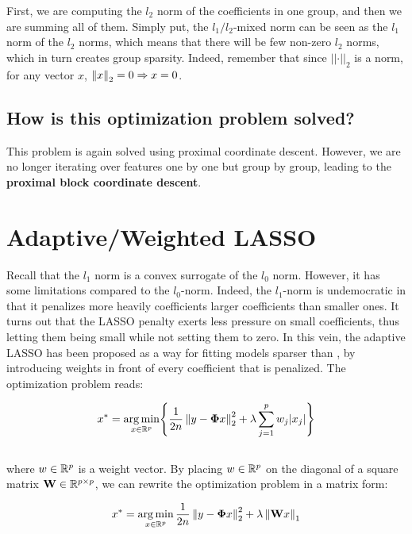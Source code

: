 \documentclass[a4paper,10pt]{article}
\theoremstyle{definition}
\begin{document}
First, we are computing the $l_2$ norm of the coefficients in one group, and then we are summing all of them. Simply put, the $l_1/l_2$-mixed norm can be seen
as the $l_1$ norm of the $l_2$ norms, which means that there will be few non-zero $l_2$ norms, which in turn creates group sparsity. Indeed, remember that since $\lvert \lvert \cdot \rvert \rvert_2$ is a norm, for any vector $x$,
$\left \lVert  x \right \rVert_2 = 0 \Rightarrow x = 0$.

\subsection*{How is this optimization problem solved?}

This problem is again solved using proximal coordinate descent. However, we are no longer iterating over features one by one but group by group, leading to the \textbf{proximal block coordinate descent}.

\section{Adaptive/Weighted LASSO}
\label{section_3}

Recall that the $l_1$ norm is a convex surrogate of the $l_0$ norm. However, it has some limitations compared to
the $l_0$-norm. Indeed, the $l_1$-norm is undemocratic in that it penalizes more heavily coefficients larger coefficients than smaller ones. It turns out that the LASSO penalty exerts less pressure on small coefficients,
thus letting them being small while not setting them to zero. In this vein, the adaptive LASSO has been proposed as a way for fitting models sparser than , by introducing weights in front of every coefficient that is
penalized. The optimization problem reads:

\begin{equation*}
    x^* = \operatorname*{arg\,min}_{x \in \mathbb{R}^p} \Biggl\{ \frac{1}{2n} \left \lVert  y - \mathbf{\Phi}x \right \rVert_2^2 + \lambda \sum_{j=1}^p w_j \lvert x_j \rvert \Biggr\}
\end{equation*}
\\
where $w \in \mathbb{R}^p$ is a weight vector. By placing $w \in \mathbb{R}^p$ on the diagonal of a square matrix $\mathbf{W} \in \mathbb{R}^{p \times p}$, we can rewrite the optimization problem in a matrix form:

\begin{equation*}
    x^* = \operatorname*{arg\,min}_{x \in \mathbb{R}^p} \frac{1}{2n} \left \lVert y - \mathbf{\Phi}x \right \rVert_2^2 + \lambda \left \lVert \mathbf{W}x \right \rVert_1
\end{equation*}
\end{document}
